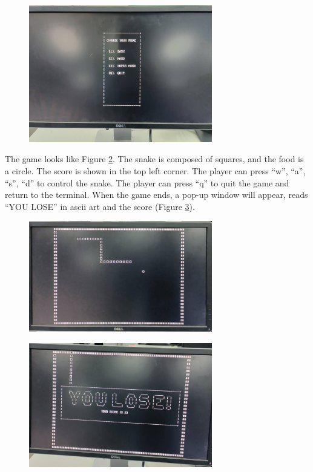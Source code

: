 \documentclass[
	a4paper, %
	11pt, %
]{CSUniSchoolLabReport}
\begin{document}
\begin{figure}[!htb]
    \centering
    \includegraphics[width=8cm]{image3.png}
    \label{fig:image3}
\end{figure}
The game looks like Figure \ref{fig:image4}. The snake is composed of squares, and the food is a circle. The score is shown in the top left corner. The player can press ``w'', ``a'', ``s'', ``d'' to control the snake. The player can press ``q'' to quit the game and return to the terminal. When the game ends, a pop-up window will appear, reads ``YOU LOSE'' in ascii art and the score (Figure \ref{fig:image5}).

\begin{figure}[!htb]
    \centering
    \includegraphics[width=8cm]{image4.png}
    \label{fig:image4}
\end{figure}

\begin{figure}[!htb]
    \centering
    \includegraphics[width=8cm]{image5.png}
    \label{fig:image5}
\end{figure}
\end{document}
